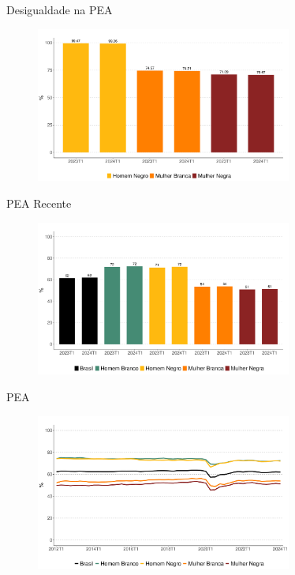 \documentclass[10pt, xcolor=x11names,compress]{beamer}
\begin{document}
		\begin{frame}{Desigualdade na PEA}
		\begin{figure}
			\centering
			\includegraphics[width = 0.75\textwidth]{figures_output/frac_pea.pdf}
		\end{figure}
	\end{frame}	

	\begin{frame}{PEA Recente}
	\begin{figure}
		\centering
		\includegraphics[width = 0.75\textwidth]{figures_output/pea.pdf}
	\end{figure}
	\end{frame}	

	\begin{frame}{PEA}
	\begin{figure}
		\centering
		\includegraphics[width = 0.75\textwidth]{figures_output/pea_br_gen_raca.pdf}
	\end{figure}
	\end{frame}	
	
\end{document}
